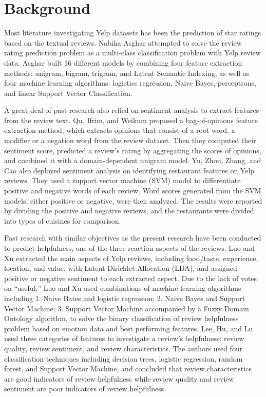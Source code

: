 \documentclass[11pt,a4paper]{article}
\begin{document}
\section{Background}
Most literature investigating Yelp datasets has been the prediction of star ratings based on the textual reviews. Nabiha Asghar \cite{DBLP:journals/corr/Asghar16} attempted to solve the review rating prediction problem as a multi-class classification problem with Yelp review data. Asghar built 16 different models by combining four feature extraction methods: unigram, bigram, trigram, and Latent Semantic Indexing, as well as four machine learning algorithms: logistics regression, Naive Bayes, perceptrons, and linear Support Vector Classification. 

A great deal of past research also relied on sentiment analysis to extract features from the review text. Qu, Ifrim, and Weikum  \cite{10.5555/1873781.1873884} proposed a bag-of-opinions feature extraction method, which extracts opinions that consist of a root word, a modifier or a negation word from the review dataset. Then they computed their sentiment score, predicted a review’s rating by aggregating the scores of opinions, and combined it with a domain-dependent unigram model. Yu, Zhou, Zhang, and Cao \cite{yu2017identifying} also deployed sentiment analysis on identifying restaurant features on Yelp reviews. They used a support vector machine (SVM) model to differentiate positive and negative words of each review. Word scores generated from the SVM models, either positive or negative, were then analyzed. The results were reported by dividing the positive and negative reviews, and the restaurants were divided into types of cuisines for comparison. 

Past research with similar objectives as the present research have been conducted to predict helpfulness, one of the three reaction aspects of the reviews. Luo and Xu \cite{su11195254} extracted the main aspects of Yelp reviews, including food/taste, experience, location, and value, with Latent Dirichlet Allocation (LDA), and assigned positive or negative sentiment to each extracted aspect. Due to the lack of votes on “useful,” Luo and Xu used combinations of machine learning algorithms including 1. Naive Bates and logistic regression; 2. Naive Bayes and Support Vector Machine; 3. Support Vector Machine accompanied by a Fuzzy Domain Ontology algorithm, to solve the binary classification of review helpfulness problem based on emotion data and best performing features. Lee, Hu, and Lu \cite{LEE2018436} used three categories of features to investigate a review’s helpfulness: review quality, review sentiment, and review characteristics. The authors used four classification techniques including decision trees, logistic regression, random forest, and Support Vector Machine, and concluded that review characteristics are good indicators of review helpfulness while review quality and review sentiment are poor indicators of review helpfulness.
\end{document}
